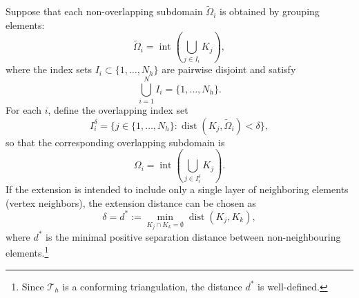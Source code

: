 \begin{enumerate}[label=(\arabic*)]
Suppose that each non-overlapping subdomain $\widetilde{\Omega}_i$ is obtained by grouping elements:  
\begin{equation*}
    \widetilde{\Omega}_i = \operatorname{int}\left(\bigcup_{j \in I_i} K_j \right),
\end{equation*}  
where the index sets $I_i \subset \{1, \ldots, N_h\}$ are pairwise disjoint and satisfy  
\begin{equation*}
    \bigcup_{i=1}^{N} I_i = \{1, \ldots, N_h\}.
\end{equation*}  
For each $i$, define the overlapping index set
\begin{equation*}
    I_i^\delta = \{ j \in \{1, \ldots, N_h\} : \operatorname{dist}(K_j, \widetilde{\Omega}_i) < \delta \},
\end{equation*}  
so that the corresponding overlapping subdomain is  
\begin{equation*}
    \Omega_i = \operatorname{int} \left(\bigcup_{j \in I_i^\delta} K_j \right).
\end{equation*}  
If the extension is intended to include only a single layer of neighboring elements (vertex neighbors), the extension distance can be chosen as  
\begin{equation*}
    \delta = d^{*} := \min_{K_{j}\cap K_{k} = \emptyset}\operatorname{dist}(K_{j}, K_{k}),
\end{equation*} 
where $d^{*}$ is the minimal positive separation distance between non-neighbouring elements.\footnote{Since $\mathcal{T}_h$ is a conforming triangulation, the distance $d^{*}$ is well-defined.}


\end{enumerate}
